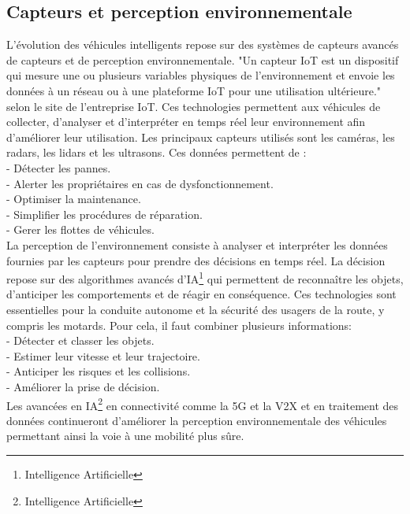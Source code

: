 \documentclass{article}
\begin{document}
\subsection{Capteurs et perception environnementale}
L'évolution des véhicules intelligents repose sur des systèmes de capteurs avancés de capteurs et de perception environnementale.
"Un capteur IoT est un dispositif qui mesure une ou plusieurs variables physiques de l'environnement et envoie les données à un réseau ou à une plateforme IoT pour une utilisation ultérieure." selon le site de l'entreprise IoT\cite{iot_capteur}.
Ces technologies permettent aux véhicules de collecter, d'analyser et d'interpréter en temps réel leur environnement afin d'améliorer leur utilisation.
Les principaux capteurs utilisés sont les caméras, les radars, les lidars et les ultrasons.
Ces données permettent de :\\
- Détecter les pannes. \\
- Alerter les propriétaires en cas de dysfonctionnement. \\
- Optimiser la maintenance. \\
- Simplifier les procédures de réparation. \\
- Gerer les flottes de véhicules. \\


La perception de l'environnement consiste à analyser et interpréter les données fournies par les capteurs pour prendre des décisions en temps réel. La décision repose sur des algorithmes avancés d'IA\footnote{Intelligence Artificielle} qui permettent de reconnaître les objets, d'anticiper les comportements et de réagir en conséquence. Ces technologies sont essentielles pour la conduite autonome et la sécurité des usagers de la route, y compris les motards.
Pour cela, il faut combiner plusieurs informations:\\
- Détecter et classer les objets. \\
- Estimer leur vitesse et leur trajectoire. \\
- Anticiper les risques et les collisions. \\
- Améliorer la prise de décision.\\
Les avancées en IA\footnote{Intelligence Artificielle} en connectivité comme la 5G et la V2X et en traitement des données continueront d’améliorer la perception environnementale des véhicules permettant ainsi la voie à une mobilité plus sûre.
\end{document}
